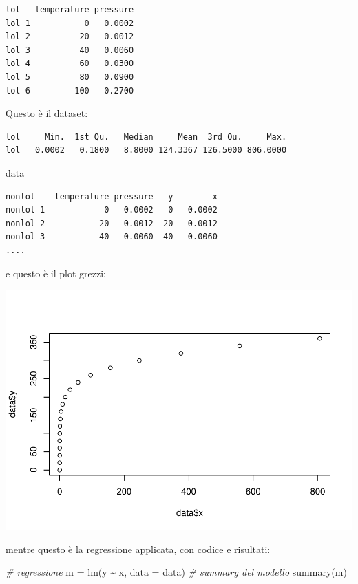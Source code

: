 \documentclass[
]{article}
\newenvironment{Shaded}{\begin{snugshade}}{\end{snugshade}}
\newcommand{\AttributeTok}[1]{\textcolor[rgb]{0.77,0.63,0.00}{#1}}
\newcommand{\CommentTok}[1]{\textcolor[rgb]{0.56,0.35,0.01}{\textit{#1}}}
\newcommand{\FunctionTok}[1]{\textcolor[rgb]{0.00,0.00,0.00}{#1}}
\newcommand{\NormalTok}[1]{#1}
\newcommand{\OtherTok}[1]{\textcolor[rgb]{0.56,0.35,0.01}{#1}}
\newcommand{\SpecialCharTok}[1]{\textcolor[rgb]{0.00,0.00,0.00}{#1}}
\begin{document}
\begin{verbatim}
lol   temperature pressure
lol 1           0   0.0002
lol 2          20   0.0012
lol 3          40   0.0060
lol 4          60   0.0300
lol 5          80   0.0900
lol 6         100   0.2700
\end{verbatim}

Questo è il dataset:

\begin{verbatim}
lol     Min.  1st Qu.   Median     Mean  3rd Qu.     Max. 
lol   0.0002   0.1800   8.8000 124.3367 126.5000 806.0000
\end{verbatim}

\begin{Shaded}
\begin{Highlighting}[]
\NormalTok{data}
\end{Highlighting}
\end{Shaded}

\begin{verbatim}
nonlol    temperature pressure   y        x
nonlol 1            0   0.0002   0   0.0002
nonlol 2           20   0.0012  20   0.0012
nonlol 3           40   0.0060  40   0.0060
....
\end{verbatim}

e questo è il plot grezzi:

\begin{center}\includegraphics{Prova_knit_files/figure-latex/unnamed-chunk-5-1} \end{center}

mentre questo è la regressione applicata, con codice e risultati:

\begin{Shaded}
\begin{Highlighting}[]
\CommentTok{\# regressione}
\NormalTok{m }\OtherTok{=} \FunctionTok{lm}\NormalTok{(y }\SpecialCharTok{\textasciitilde{}}\NormalTok{ x, }\AttributeTok{data =}\NormalTok{ data)}
\CommentTok{\# summary del modello}
\FunctionTok{summary}\NormalTok{(m)}
\end{Highlighting}
\end{Shaded}
\end{document}
